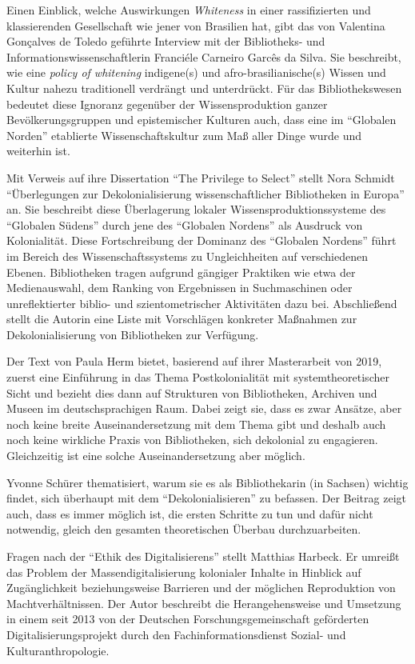 \documentclass[a4paper,
fontsize=11pt,
oneside,
numbers=noperiodatend,
parskip=half-,
bibliography=totoc,
final
]{scrartcl}
\begin{document}
Einen Einblick, welche Auswirkungen \emph{Whiteness} in einer
rassifizierten und klassierenden Gesellschaft wie jener von Brasilien
hat, gibt das von Valentina Gonçalves de Toledo geführte Interview mit
der Bibliotheks- und Informationswissenschaftlerin Franciéle Carneiro
Garcês da Silva. Sie beschreibt, wie eine \emph{policy of whitening}
indigene(s) und afro-brasilianische(s) Wissen und Kultur nahezu
traditionell verdrängt und unterdrückt. Für das Bibliothekswesen
bedeutet diese Ignoranz gegenüber der Wissensproduktion ganzer
Bevölkerungsgruppen und epistemischer Kulturen auch, dass eine im
\enquote{Globalen Norden} etablierte Wissenschaftskultur zum Maß aller
Dinge wurde und weiterhin ist.

Mit Verweis auf ihre Dissertation \enquote{The Privilege to Select}
stellt Nora Schmidt \enquote{Überlegungen zur Dekolonialisierung
wissenschaftlicher Bibliotheken in Europa} an. Sie beschreibt diese
Überlagerung lokaler Wissensproduktionssysteme des \enquote{Globalen
Südens} durch jene des \enquote{Globalen Nordens} als Ausdruck von
Kolonialität. Diese Fortschreibung der Dominanz des \enquote{Globalen
Nordens} führt im Bereich des Wissenschaftssystems zu Ungleichheiten auf
verschiedenen Ebenen. Bibliotheken tragen aufgrund gängiger Praktiken
wie etwa der Medienauswahl, dem Ranking von Ergebnissen in Suchmaschinen
oder unreflektierter biblio- und szientometrischer Aktivitäten dazu bei.
Abschließend stellt die Autorin eine Liste mit Vorschlägen konkreter
Maßnahmen zur Dekolonialisierung von Bibliotheken zur Verfügung.

Der Text von Paula Herm bietet, basierend auf ihrer Masterarbeit von
2019, zuerst eine Einführung in das Thema Postkolonialität mit
systemtheoretischer Sicht und bezieht dies dann auf Strukturen von
Bibliotheken, Archiven und Museen im deutschsprachigen Raum. Dabei zeigt
sie, dass es zwar Ansätze, aber noch keine breite Auseinandersetzung mit
dem Thema gibt und deshalb auch noch keine wirkliche Praxis von
Bibliotheken, sich dekolonial zu engagieren. Gleichzeitig ist eine
solche Auseinandersetzung aber möglich.

Yvonne Schürer thematisiert, warum sie es als Bibliothekarin (in
Sachsen) wichtig findet, sich überhaupt mit dem
\enquote{Dekolonialisieren} zu befassen. Der Beitrag zeigt auch, dass es
immer möglich ist, die ersten Schritte zu tun und dafür nicht notwendig,
gleich den gesamten theoretischen Überbau durchzuarbeiten.

Fragen nach der \enquote{Ethik des Digitalisierens} stellt Matthias
Harbeck. Er umreißt das Problem der Massendigitalisierung kolonialer
Inhalte in Hinblick auf Zugänglichkeit beziehungsweise Barrieren und der
möglichen Reproduktion von Machtverhältnissen. Der Autor beschreibt die
Herangehensweise und Umsetzung in einem seit 2013 von der Deutschen
Forschungsgemeinschaft geförderten Digitalisierungsprojekt durch den
Fachinformationsdienst Sozial- und Kulturanthropologie.
\end{document}

